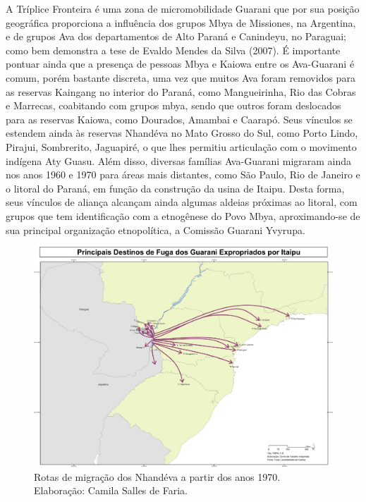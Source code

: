 {{A Tríplice Fronteira é uma zona de micromobilidade Guarani que por sua
posição geográfica proporciona a influência dos grupos Mbya de
Missiones, na Argentina, e de grupos Ava dos departamentos de Alto
Paraná e Canindeyu, no Paraguai; como bem demonstra a tese de Evaldo
Mendes da Silva (2007).  É importante pontuar ainda que a presença de
pessoas Mbya e Kaiowa entre os Ava-Guarani é comum, porém bastante
discreta, uma vez que muitos Ava foram removidos para as reservas
Kaingang no interior do Paraná, como Mangueirinha, Rio das Cobras e
Marrecas, coabitando com grupos mbya, sendo que outros foram deslocados
para as reservas Kaiowa, como Dourados, Amambai e Caarapó. Seus
vínculos se estendem ainda às reservas Nhandéva no Mato Grosso do Sul,
como Porto Lindo, Pirajui, Sombrerito, Jaguapiré, o que lhes permitiu
articulação com o movimento indígena Aty Guasu. Além disso, diversas
famílias Ava-Guarani migraram ainda nos anos 1960 e 1970 para áreas
mais distantes, como São Paulo, Rio de Janeiro e o litoral do Paraná,
em função da construção da usina de Itaipu. Desta forma, seus vínculos
de aliança alcançam ainda algumas aldeias próximas ao litoral, com
grupos que tem identificação com a etnogênese do Povo Mbya,
aproximando-se de sua principal organização etnopolítica, a Comissão
Guarani Yvyrupa.

 \begin{figure}
  \centering
 \includegraphics[width=\textwidth]{./img/GUARANIS-img8.jpg}	
  \hfill
  \caption{Rotas de migração dos Nhandéva a
partir dos anos 1970. Elaboração: Camila Salles de Faria.}
\end{figure}

}}
